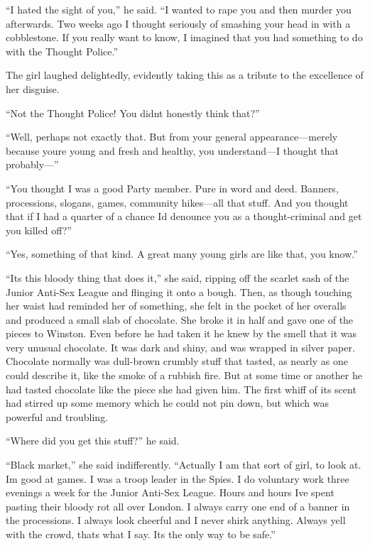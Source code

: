 ``I hated the sight of you,'' he said. ``I wanted to rape you and then
murder you afterwards. Two weeks ago I thought seriously of smashing
your head in with a cobblestone. If you really want to know, I imagined
that you had something to do with the Thought Police.''

The girl laughed delightedly, evidently taking this as a tribute to the
excellence of her disguise.

``Not the Thought Police! You didn\textquotesingle t honestly think
that?''

``Well, perhaps not exactly that. But from your general
appearance---merely because you\textquotesingle re young and fresh and
healthy, you understand---I thought that probably---''

``You thought I was a good Party member. Pure in word and deed. Banners,
processions, slogans, games, community hikes---all that stuff. And you
thought that if I had a quarter of a chance I\textquotesingle d denounce
you as a thought-criminal and get you killed off?''

``Yes, something of that kind. A great many young girls are like that,
you know.''

``It\textquotesingle s this bloody thing that does it,'' she said, ripping
off the scarlet sash of the Junior Anti-Sex League and flinging it onto
a bough. Then, as though touching her waist had reminded her of
something, she felt in the pocket of her overalls and produced a small
slab of chocolate. She broke it in half and gave one of the pieces to
Winston. Even before he had taken it he knew by the smell that it was
very unusual chocolate. It was dark and shiny, and was wrapped in silver
paper. Chocolate normally was dull-brown crumbly stuff that tasted, as
nearly as one could describe it, like the smoke of a rubbish fire. But
at some time or another he had tasted chocolate like the piece she had
given him. The first whiff of its scent had stirred up some memory which
he could not pin down, but which was powerful and troubling.

``Where did you get this stuff?'' he said.

``Black market,'' she said indifferently. ``Actually I am that sort of
girl, to look at. I\textquotesingle m good at games. I was a troop
leader in the Spies. I do voluntary work three evenings a week for the
Junior Anti-Sex League. Hours and hours I\textquotesingle ve spent
pasting their bloody rot all over London. I always carry one end of a
banner in the processions. I always look cheerful and I never shirk
anything. Always yell with the crowd, that\textquotesingle s what I say.
It\textquotesingle s the only way to be safe.''

